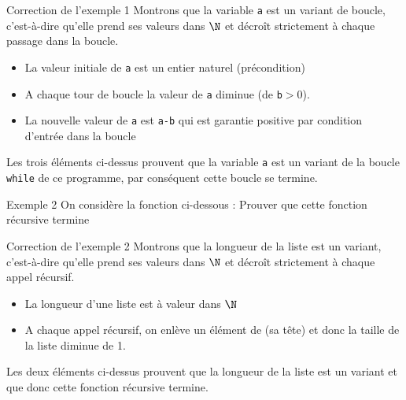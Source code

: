 \documentclass[10pt]{beamer}
\begin{document}
\begin{frame}[fragile]{\Ctitle}{\stitle}
	\begin{exampleblock}{Correction de l'exemple 1}
		\textcolor{OliveGreen}{Montrons que la variable {\tt a} est un variant de boucle, c'est-à-dire qu'elle prend ses valeurs dans $\N$ et  décroît strictement à chaque passage dans la boucle.}
		\begin{itemize}
			\item<2->{\textcolor{OliveGreen}{La valeur initiale de \texttt{a} est un entier naturel (précondition)}}
			\item<3->{\textcolor{OliveGreen}{A chaque tour de boucle la valeur de \texttt{a} diminue (de \texttt{b}$>0$).}}
			\item<4->{\textcolor{OliveGreen}{La nouvelle valeur de \texttt{a} est \texttt{a-b} qui est garantie positive par condition d'entrée dans la boucle}}
		\end{itemize}
		\textcolor{OliveGreen}{Les trois éléments ci-dessus prouvent que la variable {\tt a} est un variant de la boucle {\tt while} de ce programme, par conséquent cette boucle se termine.}
	\end{exampleblock}
\end{frame}

\begin{frame}[fragile]{\Ctitle}{\stitle}
	\begin{exampleblock}{Exemple 2}
		On considère la fonction ci-dessous :
		\onslide<2-> Prouver que cette fonction récursive termine
	\end{exampleblock}
\end{frame}

\begin{frame}[fragile]{\Ctitle}{\stitle}
	\begin{exampleblock}{Correction de l'exemple 2}
		\textcolor{OliveGreen}{Montrons que la longueur de la liste  est un variant, c'est-à-dire qu'elle prend ses valeurs dans $\N$ et  décroît strictement à chaque appel récursif.}
		\begin{itemize}
			\item<2->{\textcolor{OliveGreen}{La longueur d'une liste est à valeur dans $\N$}}
			\item<3->{\textcolor{OliveGreen}{A chaque appel récursif, on enlève un élément de  (sa tête) et donc la taille de la liste diminue de 1.}}
		\end{itemize}
		\textcolor{OliveGreen}{Les deux éléments ci-dessus prouvent que la longueur de la liste est un variant et que donc cette fonction récursive termine.}
	\end{exampleblock}
\end{frame}
\end{document}
